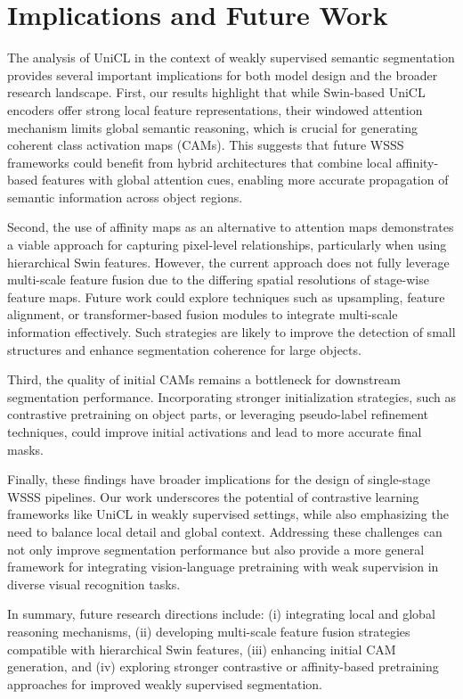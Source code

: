 
\section{Implications and Future Work}
\label{sec:implications_and_future_work}
The analysis of UniCL in the context of weakly supervised semantic segmentation provides several important implications for both model design and the broader research landscape. First, our results highlight that while Swin-based UniCL encoders offer strong local feature representations, their windowed attention mechanism limits global semantic reasoning, which is crucial for generating coherent class activation maps (CAMs). This suggests that future WSSS frameworks could benefit from hybrid architectures that combine local affinity-based features with global attention cues, enabling more accurate propagation of semantic information across object regions.  

Second, the use of affinity maps as an alternative to attention maps demonstrates a viable approach for capturing pixel-level relationships, particularly when using hierarchical Swin features. However, the current approach does not fully leverage multi-scale feature fusion due to the differing spatial resolutions of stage-wise feature maps. Future work could explore techniques such as upsampling, feature alignment, or transformer-based fusion modules to integrate multi-scale information effectively. Such strategies are likely to improve the detection of small structures and enhance segmentation coherence for large objects.  

Third, the quality of initial CAMs remains a bottleneck for downstream segmentation performance. Incorporating stronger initialization strategies, such as contrastive pretraining on object parts, or leveraging pseudo-label refinement techniques, could improve initial activations and lead to more accurate final masks.  

Finally, these findings have broader implications for the design of single-stage WSSS pipelines. Our work underscores the potential of contrastive learning frameworks like UniCL in weakly supervised settings, while also emphasizing the need to balance local detail and global context. Addressing these challenges can not only improve segmentation performance but also provide a more general framework for integrating vision-language pretraining with weak supervision in diverse visual recognition tasks.  

In summary, future research directions include: (i) integrating local and global reasoning mechanisms, (ii) developing multi-scale feature fusion strategies compatible with hierarchical Swin features, (iii) enhancing initial CAM generation, and (iv) exploring stronger contrastive or affinity-based pretraining approaches for improved weakly supervised segmentation.
